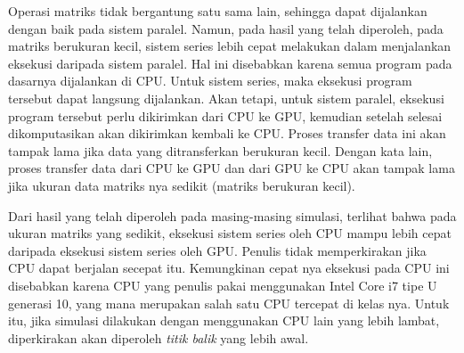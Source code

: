 Operasi matriks tidak bergantung satu sama lain, sehingga dapat dijalankan dengan baik pada sistem paralel. Namun, pada hasil yang telah diperoleh, pada matriks berukuran kecil, sistem series lebih cepat melakukan dalam menjalankan eksekusi daripada sistem paralel. Hal ini disebabkan karena semua program pada dasarnya dijalankan di CPU. Untuk sistem series, maka eksekusi program tersebut dapat langsung dijalankan. Akan tetapi, untuk sistem paralel, eksekusi program tersebut perlu dikirimkan dari CPU ke GPU, kemudian setelah selesai dikomputasikan akan dikirimkan kembali ke CPU. Proses transfer data ini akan tampak lama jika data yang ditransferkan berukuran kecil. Dengan kata lain, proses transfer data dari CPU ke GPU dan dari GPU ke CPU akan tampak lama jika ukuran data matriks nya sedikit (matriks berukuran kecil).

Dari hasil yang telah diperoleh pada masing-masing simulasi, terlihat bahwa pada ukuran matriks yang sedikit, eksekusi sistem series oleh CPU mampu lebih cepat daripada eksekusi sistem series oleh GPU. Penulis tidak memperkirakan jika CPU dapat berjalan secepat itu. Kemungkinan cepat nya eksekusi pada CPU ini disebabkan karena CPU yang penulis pakai menggunakan Intel Core i7 tipe U generasi 10, yang mana merupakan salah satu CPU tercepat di kelas nya. Untuk itu, jika simulasi dilakukan dengan menggunakan CPU lain yang lebih lambat, diperkirakan akan diperoleh \emph{titik balik} yang lebih awal.


